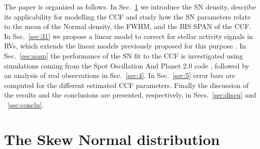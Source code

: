 \documentclass{aa}
\begin{document}

The paper is organized as follows. In Sec.~\ref{sec:2} we introduce the SN density, describe its applicability for modelling the CCF and study how the SN parameters relate to the mean of the Normal density, the FWHM, and the BIS SPAN of the CCF. 
%
In Sec.~\ref{sec:31} we propose a linear model to correct for stellar activity signals in RVs, which extends the linear models previously proposed for this purpose \citep[e.g.][]{Dumusque:2017aa,Feng:2017aa}. 
%
In Sec.~\ref{sec:soap} the performance of the SN fit to the CCF is investigated using simulations coming from the Spot Oscillation And Planet 2.0 code \citep[SOAP 2.0,][]{Dumusque-2014b}, followed by an analysis of real observations in Sec.~\ref{sec:4}.
%
In Sec.~\ref{sec:5} error bars are computed for the different estimated CCF parameters. Finally the discussion of the results and the conclusions are presented, respectively, in Secs.~\ref{sec:discu} and ~\ref{sec:conclu}.

\section{The Skew Normal distribution} \label{sec:2}
\end{document}
